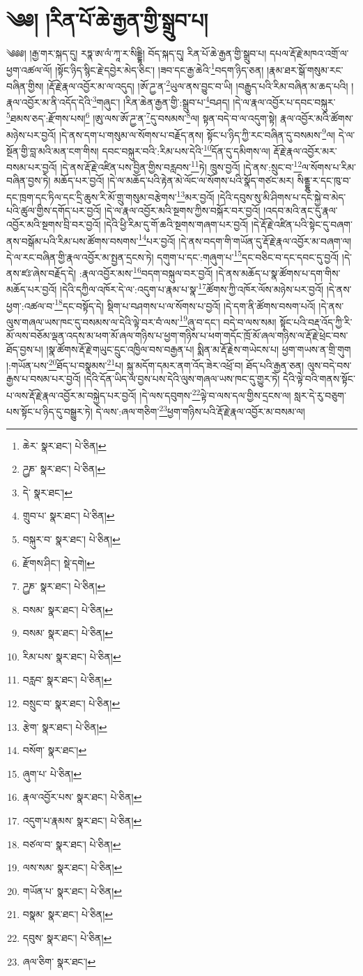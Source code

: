 \setcounter{footnote}{0} 
\chapter{༄༅། །རིན་པོ་ཆེ་རྒྱན་གྱི་སྒྲུབ་པ།}༄༅༅། །རྒྱ་གར་སྐད་དུ། རཏྣ་ཨ་ལཾ་ཀཱ་ར་སིདྡྷི། བོད་སྐད་དུ། རིན་པོ་ཆེ་རྒྱན་གྱི་སྒྲུབ་པ། དཔལ་རྡོ་རྗེ་མཁའ་འགྲོ་ལ་ཕྱག་འཚལ་ལོ། །སྟོང་ཉིད་སྙིང་རྗེ་དབྱེར་མེད་ཅིང་། །ཟབ་དང་རྒྱ་ཆེའི་\footnote{ཆེར་  སྣར་ཐང་།  པེ་ཅིན། }བདག་ཉིད་ཅན། །རྣམ་ཐར་སྒོ་གསུམ་རང་བཞིན་གྱིས། །རྡོ་རྗེ་རྣལ་འབྱོར་མ་ལ་འདུད། །ཨོ་ཌྱ་ན་\footnote{ཌྱཎ་  སྣར་ཐང་།  པེ་ཅིན། }ཡུལ་ནས་བྱུང་བ་ཡི། །བརྒྱུད་པའི་རིམ་བཞིན་མ་ཆད་པའི། །རྣལ་འབྱོར་མ་ནི་འདོད་དེའི་\footnote{དེ་  སྣར་ཐང་། }གཞུང་། །རིན་ཆེན་རྒྱན་གྱི་:སྒྲུབ་པ་\footnote{གྲུབ་པ་  སྣར་ཐང་།  པེ་ཅིན། }བཤད། །དེ་ལ་རྣལ་འབྱོར་པ་དབང་བསྐུར་\footnote{བསྐུར་བ་  སྣར་ཐང་།  པེ་ཅིན། }ཐམས་ཅད་:རྫོགས་པས།\footnote{རྫོགས་ཤིང་།  སྡེ་དགེ། } །ཨུ་ལས་ཨོ་ཌྱ་ན་\footnote{ཌྱཎ་  སྣར་ཐང་།  པེ་ཅིན། }དུ་བསམས་\footnote{བསམ་  སྣར་ཐང་།  པེ་ཅིན། }ལ། སྟན་བདེ་བ་ལ་འདུག་སྟེ། རྣལ་འབྱོར་མའི་ཚོགས་མཉེས་པར་བྱའོ། །དེ་ནས་དག་པ་གསུམ་ལ་སོགས་པ་བརྗོད་ནས། སྟོང་པ་ཉིད་ཀྱི་རང་བཞིན་དུ་བསམས་\footnote{བསམ་  སྣར་ཐང་།  པེ་ཅིན། }ལ། དེ་ལ་སྔོན་གྱི་བླ་མའི་མན་ངག་གིས། དབང་བསྐུར་བའི་:རིམ་པས་དེའི་\footnote{རིམ་པས་  སྣར་ཐང་།  པེ་ཅིན། }དོན་དུ་དམིགས་ལ། རྡོ་རྗེ་རྣལ་འབྱོར་མར་བསམ་པར་བྱའོ། །དེ་ནས་རྡོ་རྗེ་འཛིན་པས་བྱིན་གྱིས་བརླབས་\footnote{བརླབ་  སྣར་ཐང་།  པེ་ཅིན། }ཏེ། ཁྲུས་བྱའོ། །དེ་ནས་:སྲུང་བ་\footnote{བསྲུང་བ་  སྣར་ཐང་།  པེ་ཅིན། }ལ་སོགས་པ་རིམ་བཞིན་བྱས་ཏེ། མཆོད་པར་བྱའོ། །དེ་ལ་མཆོད་པའི་རྟེན་མེ་ལོང་ལ་སོགས་པའི་སྣོད་གཙང་མར། སིནྡྷུ་ར་དང་ཁུ་བ་དང་ཁྲག་དང་ཏིལ་དང་དྲི་ཆུས་རི་མོ་གྲུ་གསུམ་བརྩེགས་\footnote{རྩེག་  སྣར་ཐང་།  པེ་ཅིན། }མར་བྱའོ། །དེའི་དབུས་སུ་མི་ཤིགས་པ་དང་སྐྱེ་བ་མེད་པའི་ཚུལ་གྱིས་དགོད་པར་བྱའོ། །དེ་ལ་རྣལ་འབྱོར་མའི་སྔགས་ཀྱིས་བསྐོར་བར་བྱའོ། །འདབ་མའི་ནང་དུ་རྣལ་འབྱོར་མའི་སྔགས་བྲི་བར་བྱའོ། །དེའི་ཕྱི་རིམ་དུ་གོ་ཆའི་སྔགས་གཞག་པར་བྱའོ། །དེ་རྡོ་རྗེ་འཛིན་པའི་སྟེང་དུ་བཞག་ནས་བསྒོམ་པའི་རིམ་པས་ཚོགས་བསགས་\footnote{བསོག་  སྣར་ཐང་། }པར་བྱའོ། །དེ་ནས་བདག་གི་གཡོན་དུ་རྡོ་རྗེ་རྣལ་འབྱོར་མ་བཞག་ལ། དེ་ལ་རང་བཞིན་གྱི་རྣལ་འབྱོར་མ་སྤྱན་དྲངས་ཏེ། དགུག་པ་དང་:གཞུག་པ་\footnote{ཞུག་པ་  པེ་ཅིན། }དང་བཅིང་བ་དང་དབང་དུ་བྱའོ། །དེ་ནས་ཛཿ་ཞེས་བརྗོད་དེ། :རྣལ་འབྱོར་མས་\footnote{རྣལ་འབྱོར་པས་  སྣར་ཐང་།  པེ་ཅིན། }བདག་བསྐུལ་བར་བྱའོ། །དེ་ནས་མཆོད་པ་སྣ་ཚོགས་པ་དག་གིས་མཆོད་པར་བྱའོ། །དེའི་དཀྱིལ་འཁོར་དེ་ལ་:འདུག་པ་རྣམ་པ་སྣ་\footnote{འདུག་པ་རྣམས་  སྣར་ཐང་།  པེ་ཅིན། }ཚོགས་ཀྱི་འཁོར་ལོས་མཉེས་པར་བྱའོ། །དེ་ནས་ཕྱག་:འཚལ་བ་\footnote{བཙལ་བ་  སྣར་ཐང་།  པེ་ཅིན། }དང་བསྟོད་དེ། སྡིག་པ་བཤགས་པ་ལ་སོགས་པ་བྱའོ། །དེ་དག་ནི་ཚོགས་བསག་པའོ། །དེ་ནས་ལུས་གཞལ་ཡས་ཁང་དུ་བསམས་ལ་དེའི་ལྟེ་བར་བཾ་ལས་\footnote{ལས་སམ་  སྣར་ཐང་།  པེ་ཅིན། }ཞུ་བ་དང་། བདེ་བ་ལས་སམ། སྟོང་པའི་བརྡ་འོད་ཀྱི་རི་མོ་ལས་བཅོམ་ལྡན་འདས་མ་ཕག་མོ་ཞལ་གཉིས་པ་ཕྱག་གཉིས་པ་ཕག་གདོང་ཁྲོ་མོ་ཞལ་གཉིས་ལ་རྡོ་རྗེ་ཕྲེང་བས་ཐོད་བྱས་པ། །སྣ་ཚོགས་རྡོ་རྗེ་གཡུང་དྲུང་འཁྱིལ་བས་བརྒྱན་པ། སྨིན་མ་རྡོ་རྗེས་གཡེངས་པ། ཕྱག་གཡས་ན་གྲི་གུག །:གཡོན་པས་\footnote{གཡོན་པ་  སྣར་ཐང་།  པེ་ཅིན། }ཐོད་པ་བསྣམས་\footnote{བསྣམ་  སྣར་ཐང་།  པེ་ཅིན། }པ། སྐུ་མདོག་དམར་ནག་འོད་ཟེར་འཕྲོ་བ། ཐོད་པའི་རྒྱན་ཅན། ལུས་བདེ་བས་རྒྱས་པ་བསམ་པར་བྱའོ། །དེའི་དོན་ཡིད་ལ་བྱས་པས་དེའི་ལུས་གཞལ་ཡས་ཁང་དུ་གྱུར་ཏེ། དེའི་ལྟེ་བའི་གནས་སྟོང་པ་ལས་རྡོ་རྗེ་རྣལ་འབྱོར་མ་བསྐྱེད་པར་བྱའོ། །དེ་ལས་དབུགས་\footnote{དབུས་  སྣར་ཐང་།  པེ་ཅིན། }ལྟེ་བ་ལས་དལ་གྱིས་དྲངས་ལ། སླར་དེ་རུ་བཅུག་པས་སྟོང་པ་ཉིད་དུ་བསྒྱུར་ཏེ། དེ་ལས་:ཞལ་གཅིག་\footnote{ཞལ་ཅིག་  སྣར་ཐང་། }ཕྱག་གཉིས་པའི་རྡོ་རྗེ་རྣལ་འབྱོར་མ་བསམ་ལ། 